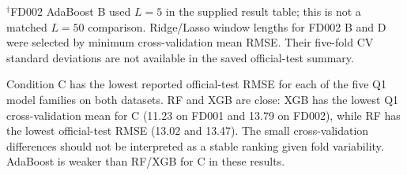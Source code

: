 \documentclass[10pt,a4paper]{article}
\begin{document}
\begin{table}[H]\centering\scriptsize
\caption{Q1 official-test RMSE (cycles; lower is better) for all five model families. The condition labels A--D are defined in the Methodology section. Tree-model values use the reported fixed window settings; Ridge/Lasso use the selected window shown in parentheses where it differs from 50. Each value is from the single official-test evaluation, except D, which is averaged over three within-window shuffle seeds.}\label{tab:q1test}
\vspace{2pt}\par\footnotesize $^\dagger$FD002 AdaBoost B used $L=5$ in the supplied result table; this is not a matched $L=50$ comparison. Ridge/Lasso window lengths for FD002 B and D were selected by minimum cross-validation mean RMSE. Their five-fold CV standard deviations are not available in the saved official-test summary.
\end{table}

Condition C has the lowest reported official-test RMSE for each of the five Q1 model families on both datasets. RF and XGB are close: XGB has the lowest Q1 cross-validation mean for C (11.23 on FD001 and 13.79 on FD002), while RF has the lowest official-test RMSE (13.02 and 13.47). The small cross-validation differences should not be interpreted as a stable ranking given fold variability. AdaBoost is weaker than RF/XGB for C in these results.
\end{document}
